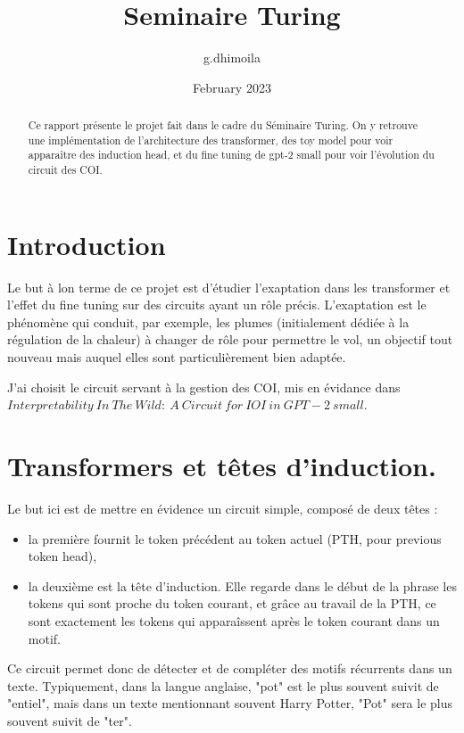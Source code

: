 \documentclass{article}
\title{Seminaire Turing}
\author{g.dhimoila }
\date{February 2023}
\begin{document}
\maketitle


\begin{abstract}
Ce rapport présente le projet fait dans le cadre du Séminaire Turing. On y retrouve une implémentation de l'architecture des transformer, des toy model pour voir apparaître des induction head, et du fine tuning de gpt-2 small pour voir l'évolution du circuit des COI.
\end{abstract}

\section{Introduction}

Le but à lon terme de ce projet est d'étudier l'exaptation dans les transformer et l'effet du fine tuning sur des circuits ayant un rôle précis. L'exaptation est le phénomène qui conduit, par exemple, les plumes (initialement dédiée à la régulation de la chaleur) à changer de rôle pour permettre le vol, un objectif tout nouveau mais auquel elles sont particulièrement bien adaptée.

J'ai choisit le circuit servant à la gestion des COI, mis en évidance dans $Interpretability\ In\ The\ Wild:\ A\ Circuit\ for\ IOI\ in\ GPT-2\ small$.

\section{Transformers et têtes d'induction.}

Le but ici est de mettre en évidence un circuit simple, composé de deux têtes :
\begin{itemize}
    \item la première fournit le token précédent au token actuel (PTH, pour previous token head),
    \item la deuxième est la tête d'induction. Elle regarde dans le début de la phrase les tokens qui sont proche du token courant, et grâce au travail de la PTH, ce sont exactement les tokens qui apparaîssent après le token courant dans un motif.
\end{itemize}
Ce circuit permet donc de détecter et de compléter des motifs récurrents dans un texte. Typiquement, dans la langue anglaise, "pot" est le plus souvent suivit de "entiel", mais dans un texte mentionnant souvent Harry Potter, "Pot" sera le plus souvent suivit de "ter".
\end{document}
